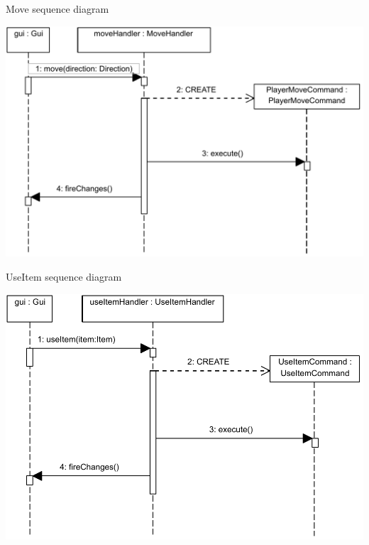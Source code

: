\documentclass[11pt,t]{beamer}
\begin{document}
\begin{frame}{Move sequence diagram}
\begin{center}
\includegraphics[scale=0.45]{images/movehandlerseq}
\end{center}
\end{frame}

\begin{frame}{UseItem sequence diagram}
\begin{center}
\includegraphics[scale=0.45]{images/useitemhandlerseq}
\end{center}
\end{frame}
\end{document}

